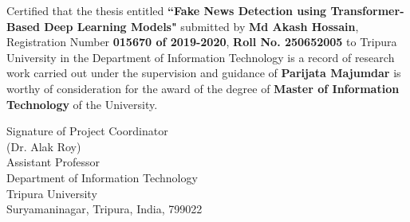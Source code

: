 \noindent Certified that the thesis entitled {\bf ``Fake News Detection using Transformer-Based Deep Learning Models"} submitted by {\bf Md Akash Hossain}, Registration Number {\bf 015670 of 2019-2020}, {\bf Roll No. 250652005} to Tripura University in the Department of Information Technology is a record of research work carried out under the supervision and guidance of {\bf Parijata Majumdar} is worthy of consideration for the award of the degree of {\bf Master of Information Technology} of the University.

\vspace{1.1 in}
\begin{flushright}
Signature of Project Coordinator\\
(Dr. Alak Roy)\\
Assistant Professor\\
Department of Information Technology\\
Tripura University\\
Suryamaninagar, Tripura, India, 799022 
\end{flushright}


